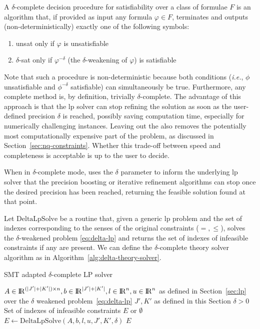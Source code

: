 \documentclass[runningheads]{llncs}
\begin{document}
\begin{definition}\cite{paper:delta-complete}
    A $\delta$-complete decision procedure for satisfiability over a class of formulae $F$ is an algorithm that, if provided as input any formula $\varphi \in F$, terminates and outputs (non-deterministically) exactly one of the following symbols:
    \begin{enumerate}
        \item unsat only if $\varphi$ is unsatisfiable
        \item $\delta$-sat only if $\varphi^{-\delta}$ (the $\delta$-weakening of $\varphi$) is satisfiable
    \end{enumerate}
\end{definition}
Note that such a procedure is non-deterministic because both conditions ({\em i.e.}, $\phi$ unsatisfiable and $\phi^{-\delta}$ satisfiable) can simultaneously be true.
Furthermore, any complete method is, by definition, trivially $\delta$-complete.
The advantage of this approach is that the \gls{lp} solver can stop refining the solution as soon as the user-defined precision $\delta$ is reached, possibly saving computation time, especially for numerically challenging instances.
Leaving out the \nqcs also removes the potentially most computationally expensive part of the problem, as discussed in Section~\ref{sec:nq-constraints}.
Whether this trade-off between speed and completeness is acceptable is up to the user to decide.

When in $\delta$-complete mode, \dlinear uses the $\delta$ parameter to inform the underlying \gls{lp} solver that the precision boosting or iterative refinement algorithms can stop once the desired precision has been reached, returning the feasible solution found at that point.

Let $\text{DeltaLpSolve}$ be a routine that, given a generic \gls{lp} problem and the set of indexes corresponding to the senses of the original constraints ($=, \le$), solves the $\delta$-weakened problem \eqref{eq:delta-lp} and returns the set of indexes of infeasible constraints if any are present.
We can define the $\delta$-complete theory solver algorithm as in Algorithm~\ref{alg:delta-theory-solver}.

\begin{algorithm}
    \caption{SMT adapted $\delta$-complete LP solver}\label{alg:delta-theory-solver}
    \begin{algorithmic}
        \Require $A \in {\rm I\!R}^{(|J'| + |K'|) \times n}, b \in {\rm I\!R}^{|J'| + |K'|}, l \in {\rm I\!R}^n, u \in {\rm I\!R}^n$ \newline
        \qquad as defined in Section~\ref{sec:lp} over the $\delta$ weakened problem~\eqref{eq:delta-lp}
        \Require $J', K'$ as defined in this Section
        \Require $\delta > 0$
        \Ensure Set of indexes of infeasible constraints $E$ or $\emptyset$
        \State $E \gets \text{DeltaLpSolve}(A, b, l, u, J', K', \delta)$ 
        \State \Return $E$
    \end{algorithmic}
\end{algorithm}
\end{document}
